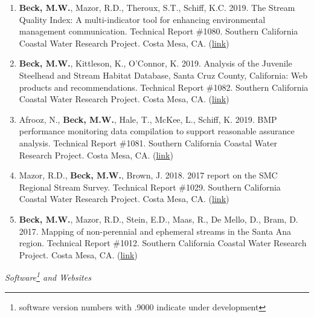 \documentclass[letterpaper,12pt]{article}
\begin{document}
\begin{enumerate}

\item \textbf{Beck, M.W.}, Mazor, R.D., Theroux, S.T., Schiff, K.C. 2019. The Stream Quality Index: A multi-indicator tool for enhancing environmental management communication. Technical Report \#1080. Southern California Coastal Water Research Project. Costa Mesa, CA. ({\footnotesize\href{http://ftp.sccwrp.org/pub/download/DOCUMENTS/TechnicalReports/1080_StreamQualityIndex.pdf}{link}})

\item \textbf{Beck, M.W.}, Kittleson, K., O'Connor, K. 2019. Analysis of the Juvenile Steelhead and Stream Habitat Database, Santa Cruz County, California: Web products and recommendations. Technical Report \#1082. Southern California Coastal Water Research Project. Costa Mesa, CA. ({\footnotesize\href{http://ftp.sccwrp.org/pub/download/DOCUMENTS/TechnicalReports/1082_SantaCruzSteelheads.pdf}{link}})

\item Afrooz, N., \textbf{Beck, M.W.}, Hale, T., McKee, L., Schiff, K. 2019. BMP performance monitoring data compilation to support reasonable assurance analysis. Technical Report \#1081. Southern California Coastal Water Research Project. Costa Mesa, CA. ({\footnotesize\href{http://ftp.sccwrp.org/pub/download/DOCUMENTS/TechnicalReports/1081_BMPPerformanceRAA.pdf}{link}})

\item Mazor, R.D., \textbf{Beck, M.W.}, Brown, J. 2018. 2017 report on the SMC Regional Stream Survey. Technical Report \#1029. Southern California Coastal Water Research Project. Costa Mesa, CA. ({\footnotesize\href{http://ftp.sccwrp.org/pub/download/DOCUMENTS/TechnicalReports/1029_2017SMCReport.pdf}{link}})

\item \textbf{Beck, M.W.}, Mazor, R.D., Stein, E.D., Maas, R., De Mello, D., Bram, D. 2017. Mapping of non-perennial and ephemeral streams in the Santa Ana region. Technical Report \#1012. Southern California Coastal Water Research Project. Costa Mesa, CA. ({\footnotesize\href{http://ftp.sccwrp.org/pub/download/DOCUMENTS/TechnicalReports/1012_MappingStreamsSantaAna.pdf}{link}})

\end{enumerate}

\vspace{\baselineskip} 
\centerline{\large{\textit{Software\footnote{software version numbers with .9000 indicate under development} and Websites}}}
\end{document}
